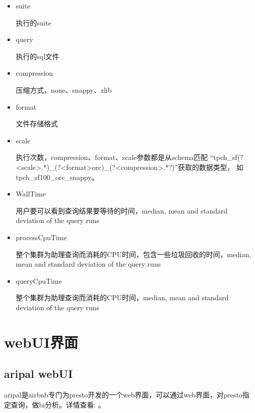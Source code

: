 \documentclass[letterpaper,10pt,english]{sphinxmanual}
\begin{document}
\begin{itemize}
\item {} 
suite

执行的suite

\item {} 
query

执行的sql文件

\item {} 
compression

压缩方式，none、snappy、zlib

\item {} 
format

文件存储格式

\item {} 
scale

执行次数，compression、format、scale参数都是从schema匹配 “tpch\_sf(?\textless{}scale\textgreater{}.*)\_(?\textless{}format\textgreater{}orc)\_(?\textless{}compression\textgreater{}.*?)”获取的数据类型，
如tpch\_sf100\_orc\_snappy。

\item {} 
WallTime

用户要可以看到查询结果要等待的时间，median, mean and standard deviation of the query runs

\item {} 
processCpuTime

整个集群为助理查询而消耗的CPU时间，包含一些垃圾回收的时间，median, mean and standard deviation of the query runs

\item {} 
queryCpuTime

整个集群为助理查询而消耗的CPU时间，median, mean and standard deviation of the query runs

\end{itemize}


\section{webUI界面}
\label{\detokenize{installation/webui:webui}}\label{\detokenize{installation/webui::doc}}

\subsection{aripal webUI}
\label{\detokenize{installation/webui:aripal-webui}}
aripal是airbnb专门为presto开发的一个web界面，可以通过web界面，对presto指定查询，做bi分析。详情查看: 。
\end{document}
